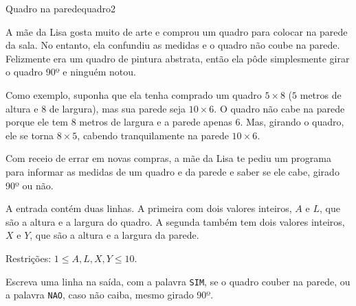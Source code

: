 \documentclass[12pt,a4paper,oneside]{article}
\begin{document}
\begin{problem}{Quadro na parede}{quadro}{2}

\begingroup
\setlength{\intextsep}{0pt}%

A mãe da Lisa gosta muito de arte e comprou um quadro para colocar na parede da sala. No entanto, ela confundiu as medidas e o quadro não coube na parede.
Felizmente era um quadro de pintura abstrata, então ela pôde simplesmente girar o quadro 90º e ninguém notou.

Como exemplo, suponha que ela tenha comprado um quadro $5 \times 8$ ($5$ metros de altura e $8$ de largura), mas sua parede seja $10 \times 6$. O quadro não cabe na parede porque ele tem $8$ metros de largura e a parede apenas $6$.
Mas, girando o quadro, ele se torna  $8 \times 5$, cabendo tranquilamente na parede $10 \times 6$.

Com receio de errar em novas compras, a mãe da Lisa te pediu um programa para informar as medidas de um quadro e da parede e saber se ele cabe, girado 90º ou não.


\InputFile

A entrada contém duas linhas. A primeira com dois valores inteiros, $A$ e $L$, que são a altura e a largura do quadro. A segunda também tem dois valores inteiros, $X$ e $Y$, que são a altura e a largura da parede.

Restrições: $1 \leq A, L, X, Y \leq 10$.

\endgroup

\OutputFile

Escreva uma linha na saída, com a palavra \texttt{SIM}, se o quadro couber na parede, ou a palavra \texttt{NAO}, caso não caiba, mesmo girado 90º.


\Example

\begin{example}
%
\end{example}

\begin{example}
%
\end{example}

\begin{example}
%
\end{example}

\begin{example}
%
\end{example}


\end{problem}
\end{document}
